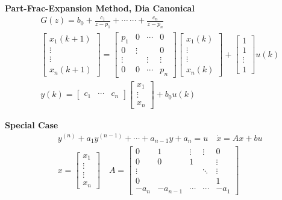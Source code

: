 \begin{multicols*}{3}
\textbf{Part-Frac-Expansion Method, Dia Canonical} %
\vspace{-0.425cm}
\begin{align*}
& G(z) =  b_0 + \frac{c_1}{z-p_1} + \cdots \ \cdots + \frac{c_n}{z-p_n} \\
& \begin{bmatrix}
x_1(k+1) \\
\vdots \\
\vdots \\
x_n(k+1)
\end{bmatrix} =  \begin{bmatrix}
p_1     & 0       & \cdots  & 0      \\
0       & \vdots  &         & 0      \\
\vdots  &         &  \vdots & \vdots \\
0       & 0       &  \cdots & p_n
\end{bmatrix}\begin{bmatrix}
x_1(k) \\
\vdots \\
\vdots \\
x_n(k)
\end{bmatrix} + \begin{bmatrix}
1 \\
1 \\
\vdots \\
1
\end{bmatrix} u(k) \\
&  y(k) = \begin{bmatrix}
c_1 & \cdots & c_n
\end{bmatrix} \begin{bmatrix}
x_1    \\
\vdots \\
x_n
\end{bmatrix} + b_0 u(k)
\end{align*}

\textbf{Special Case} %
%
\vspace{-0.425cm}
\begin{align*}
& y^{(n)}+a_1y^{(n-1)}+ \cdots + a_{n-1}y+a_{n}=u \quad \dot{x} = Ax + bu  \\
& x = \begin{bmatrix}
x_1 \\
\vdots \\
\vdots \\
x_n
\end{bmatrix} \quad 
A = \begin{bmatrix}
0      & 1        &  \vdots & \vdots       & 0        \\
0      & 0        &  1      &              & \vdots   \\
\vdots &          &         & \ddots       & \vdots   \\
0      &          &         &              &  1       \\
-a_n   & -a_{n-1} &  \cdots & \cdots       & -a_1 
\end{bmatrix}
\end{align*}


\end{multicols*}
